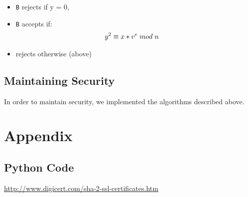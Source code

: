 \documentclass[10pt]{article}
\begin{document}
\begin{itemize}
    \item \texttt{B} rejects if y = 0,
    \item \texttt{B} accepts if:
        \begin{align*}
            y^{2} &\equiv x*v^{e} \thickspace mod \thickspace n
        \end{align*}
    \item rejects otherwise (above)
\end{itemize}


\subsection{Maintaining Security}
In order to maintain security, we implemented the algorithms described above.


\newpage
\section{Appendix}
    \subsection{Python Code}
    
    
    
    
    
    
    
    
    
    

\newpage
\begin{thebibliography}{9}
     \url{http://www.digicert.com/sha-2-ssl-certificates.htm}
\end{thebibliography}
\end{document}
